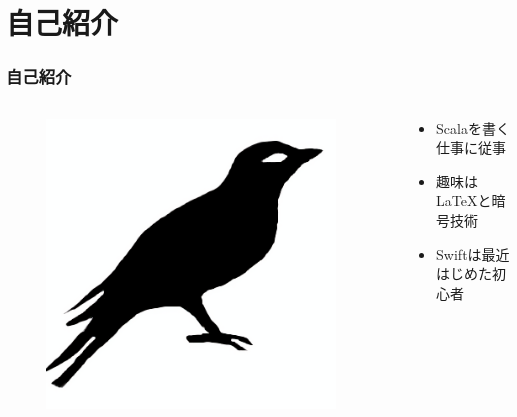 




\newcommand\ballref[1]{%
\tikz \node[circle, shade,ball color=structure.fg,inner sep=0pt,%
  text width=8pt,font=\tiny,align=center] {\color{white}\ref{#1}};
}



\frame{\maketitle}

\section{自己紹介}
\begin{frame}
  \frametitle{自己紹介}
  
  \begin{columns}
    \begin{column}{0.3\textwidth}
      \centering
      \begin{figure}
        \includegraphics[width=0.95\textwidth]{img/bird2x.png}
      \end{figure}
    \end{column}
    \begin{column}{0.7\textwidth}
      \begin{itemize}
        \item<2-> Scalaを書く仕事に従事
        \item<3-> 趣味は\LaTeX と暗号技術
        \item<4-> Swiftは最近はじめた初心者 
      \end{itemize}
    \end{column}
  \end{columns}
\end{frame}

